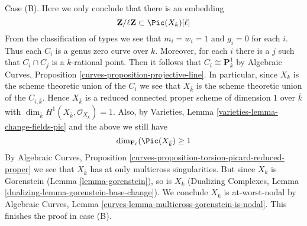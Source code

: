 \medskip\noindent
Case (B). Here we only conclude that there is an embedding
$$
\mathbf{Z}/\ell \mathbf{Z} \subset \Pic(X_k)[\ell]
$$
From the classification of types we see that $m_i = w_i = 1$ and $g_i = 0$
for each $i$. Thus each $C_i$ is a genus zero curve over $k$.
Moreover, for each $i$ there is a $j$ such that
$C_i \cap C_j$ is a $k$-rational point. Then it follows that
$C_i \cong \mathbf{P}^1_k$ by
Algebraic Curves, Proposition \ref{curves-proposition-projective-line}.
In particular, since $X_k$ is the scheme theoretic union of the
$C_i$ we see that $X_{\overline{k}}$ is the
scheme theoretic union of the $C_{i, \overline{k}}$.
Hence $X_{\overline{k}}$ is a reduced connected proper
scheme of dimension $1$ over $\overline{k}$ with $\dim_{\overline{k}}
H^1(X_{\overline{k}}, \mathcal{O}_{X_{\overline{k}}}) = 1$.
Also, by Varieties, Lemma \ref{varieties-lemma-change-fields-pic}
and the above we still have
$$
\dim_{\mathbf{F}_\ell}(\Pic(X_{\overline{k}}) \geq 1
$$
By Algebraic Curves, Proposition
\ref{curves-proposition-torsion-picard-reduced-proper}
we see that $X_{\overline{k}}$ has at only multicross singularities.
But since $X_k$ is Gorenstein (Lemma \ref{lemma-gorenstein}),
so is $X_{\overline{k}}$ (Dualizing Complexes, Lemma
\ref{dualizing-lemma-gorenstein-base-change}).
We conclude $X_{\overline{k}}$ is at-worst-nodal by
Algebraic Curves, Lemma \ref{curves-lemma-multicross-gorenstein-is-nodal}.
This finishes the proof in case (B).

